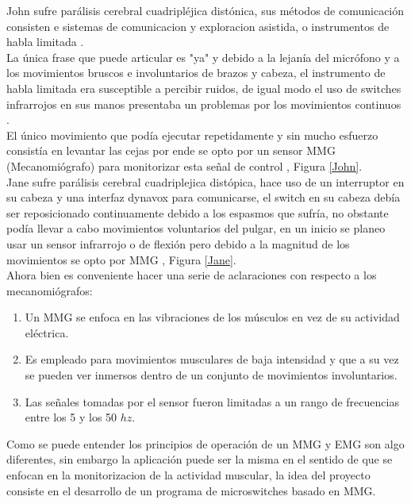 John sufre parálisis cerebral cuadripléjica distónica, sus métodos de comunicación consisten e sistemas de comunicacion y exploracion asistida, o instrumentos de habla limitada \cite{chau2016paediatric}. \\

La única frase que puede articular es "ya" y debido a la lejanía del micrófono y a los movimientos bruscos e involuntarios de brazos y cabeza, el instrumento de habla limitada era susceptible a percibir ruidos, de igual modo el uso de switches infrarrojos en sus manos presentaba un problemas por los movimientos continuos \cite{chau2016paediatric}. \\

El único movimiento que podía ejecutar repetidamente y sin mucho esfuerzo consistía en levantar las cejas por ende se opto por un sensor MMG (Mecanomiógrafo) para monitorizar esta señal de control \cite{chau2016paediatric}, Figura \ref{John}. \\

Jane sufre parálisis cerebral cuadriplejica distópica, hace uso de un interruptor en su cabeza y una interfaz dynavox para comunicarse, el switch en su cabeza debía ser reposicionado continuamente debido a los espasmos que sufría, no obstante podía llevar a cabo movimientos voluntarios del pulgar, en un inicio se planeo usar un sensor infrarrojo o de flexión pero debido a la magnitud de los movimientos se opto por MMG \cite{chau2016paediatric}, Figura \ref{Jane}. \\

Ahora bien es conveniente hacer una serie de aclaraciones con respecto a los mecanomiógrafos:

\begin{enumerate}
	\item Un MMG se enfoca en las vibraciones de los músculos en vez de su actividad eléctrica.
    \item Es empleado para movimientos musculares de baja intensidad y que a su vez se pueden ver inmersos dentro de un conjunto de movimientos involuntarios.
    \item Las señales tomadas por el sensor fueron limitadas a un rango de frecuencias entre los 5 y los 50 $hz$.
\end{enumerate}

Como se puede entender los principios de operación de un MMG y EMG son algo diferentes, sin embargo la aplicación puede ser la misma en el sentido de que se enfocan en la monitorizacion de la actividad muscular, la idea del proyecto consiste en el desarrollo de un programa de microswitches basado en MMG.

